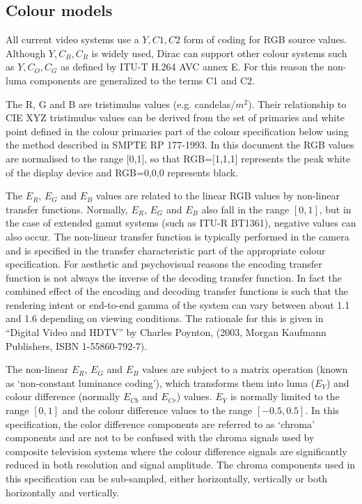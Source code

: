\label{vidsys}

\begin{informative*}
\subsection{Colour models}
All current video systems use a $Y, C1, C2$ form of coding for RGB source 
values. Although $Y, C_B, C_R$ is widely used, Dirac can support other colour
systems such as $Y, C_O, C_G$ as defined by ITU-T H.264 AVC annex E. For this
reason the non-luma components are generalized to the terms C1 and C2.

The R, G and B are tristimulus values (e.g. candelas/$m^2$). Their
relationship to CIE XYZ tristimulus values can be derived from the set
of primaries and white point defined in the colour primaries part of the
colour specification below using the method described in SMPTE RP
177-1993. In this document the RGB values are normalised to the range
[0,1], so that RGB=[1,1,1] represents the peak white of the display device
and RGB=0,0,0 represents black.

The $E_R$, $E_G$ and $E_B$ values are related to the linear RGB 
values by non-linear transfer functions. 
Normally, $E_R$, $E_G$ and $E_B$ also fall in the range $[0,1]$, but in the
case of extended gamut systems (such as ITU-R BT1361), negative values can also
occur. The non-linear transfer function is typically performed in the camera and
is specified in the transfer characteristic part of the appropriate colour 
specification. For aesthetic and psychovisual reasons
the encoding transfer function is not always the inverse of
the decoding transfer function. In fact the combined effect of the
encoding and decoding transfer functions is such that the rendering intent or 
end-to-end gamma of the system can vary between about 1.1 and 1.6 depending on
 viewing conditions. The rationale for this is given in “Digital Video and
HDTV” by Charles Poynton, (2003, Morgan Kaufmann Publishers, ISBN 1-55860-792-7).

The non-linear $E_R$, $E_G$ and $E_B$ values are subject to a matrix operation
(known as `non-constant luminance coding'), which transforms
them into luma ($E_Y$) and colour difference (normally $E_{Cb}$ and $E_{Cr}$) values. 
$E_Y$ is normally limited to the range $[0,1]$ and the colour difference
values to the range $[-0.5, 0.5]$. In this specification, the color difference
components are referred to as `chroma’ components and are not to be confused 
with the chroma signals used by composite television systems where the colour 
difference signals are significantly reduced in both resolution and signal
amplitude. The chroma components used in this specification can be sub-sampled,
 either horizontally, vertically or both horizontally and vertically.


\end{informative*}
